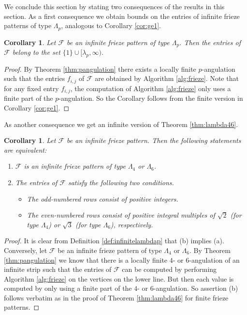 \documentclass[11pt,a4paper]{amsart}
\newtheorem{Corollary}[Lemma]{Corollary}
\theoremstyle{definition}
\numberwithin{equation}{section}
\begin{document}
We conclude this section by stating two consequences of the results in this section. 
As a first consequence we obtain bounds on the entries 
of infinite frieze patterns of type $\Lambda_p$, analogous to Corollary \ref{cor:ge1}.

\begin{Corollary} \label{cor:infge1}
Let $\mathcal{F}$ be an infinite frieze pattern of type $\Lambda_p$. Then the entries of $\mathcal{F}$
belong to the set $\{1\}\cup [\lambda_p,\infty)$. 
\end{Corollary}

\begin{proof}
By Theorem \ref{thm:pangulation} there exists a locally finite $p$-angulation such that the entries 
$f_{i,j}$ of $\mathcal{F}$ are obtained by Algorithm \ref{alg:frieze}. Note that for any fixed entry
$f_{i,j}$, the computation of Algorithm \ref{alg:frieze} only uses a finite part of the $p$-angulation. 
So the Corollary follows from the finite version in Corollary \ref{cor:ge1}.  
\end{proof}

As another consequence we get an infinite version of Theorem \ref{thm:lambda46}.

\begin{Corollary} \label{cor:inflambda46}
Let $\mathcal{F}$ be an infinite frieze pattern. Then the following statements are equivalent:
\begin{enumerate}
\item[{(a)}] $\mathcal{F}$ is an infinite frieze pattern of type $\Lambda_4$ or $\Lambda_6$.
\item[{(b)}] The entries of $\mathcal{F}$ satisfy the following two conditions. 
\begin{itemize}
\item[{(i)}] The odd-numbered rows consist of positive integers.
\item[{(ii)}] The even-numbered rows consist of positive integral multiples of $\sqrt{2}$ (for type $\Lambda_4$)
or $\sqrt{3}$ (for type $\Lambda_6$), respectively.
\end{itemize}
\end{enumerate}
\end{Corollary}

\begin{proof} It is clear from Definition \ref{def:infinitelambdap} that (b) implies (a). Conversely, 
let $\mathcal{F}$ be an infinite frieze pattern of type $\Lambda_4$ or $\Lambda_6$.
By Theorem \ref{thm:pangulation} we know that there is a locally finite $4$- or $6$-angulation of an infinite strip
such that the entries of $\mathcal{F}$ can be computed by performing Algorithm \ref{alg:frieze}
on the vertices on the lower line. But then each value is computed by only using a finite part 
of the $4$- or $6$-angulation. So assertion (b) follows verbatim as in the proof of Theorem \ref{thm:lambda46}
for finite frieze patterns.  
\end{proof}
\end{document}
